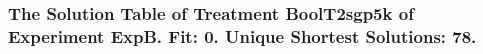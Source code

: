  \begin{frame}
 \fontsize{8pt}{9pt}\selectfont
 \frametitle{ The Solution Table of Treatment BoolT2sgp5k of Experiment ExpB. Fit: 0. Unique Shortest Solutions: 78. }

 \label{ExpBSolutionTable013.tex}  
 \end{frame}

